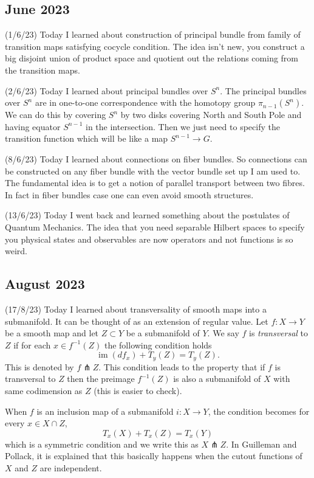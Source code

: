 \documentclass[12pt,a4paper]{article}
\begin{document}
\subsection*{June 2023}

\quad (1/6/23) Today I learned about construction of principal bundle from family of transition maps satisfying cocycle condition. The idea isn't new, you construct a big disjoint union of product space and quotient out the relations coming from the transition maps.

(2/6/23) Today I learned about principal bundles over $ S^{n} $. The principal bundles over $ S^{n} $ are in one-to-one correspondence with the homotopy group $ \pi_{n-1}(S^{n}) $. We can do this by covering $ S^{n} $ by two disks covering North and South Pole and having equator $ S^{n-1} $ in the intersection. Then we just need to specify the transition function which will be like a map $ S^{n-1} \to G $. 

(8/6/23) Today I learned about connections on fiber bundles. So connections can be constructed on any fiber bundle with the vector bundle set up I am used to. The fundamental idea is to get a notion of parallel transport between two fibres. In fact in fiber bundles case one can even avoid smooth structures.

(13/6/23) Today I went back and learned something about the postulates of Quantum Mechanics. The idea that you need separable Hilbert spaces to specify you physical states and observables are now operators and not functions is so weird.

\subsection*{August 2023}
\quad (17/8/23) Today I learned about transversality of smooth maps into a submanifold. It can be thought of as an extension of regular value. Let $ f :X \to Y $ be a smooth map and let $ Z \subset Y $ be a submanifold of $ Y $. We say $ f $ is \textit{transversal} to $ Z $ if for each $ x \in f^{-1}(Z) $ the following condition holds 
\[ \operatorname{im}(d f_{x})+ T_{y}(Z)  = T_{y}(Z).\]
This is denoted by $ f \pitchfork Z $. This condition leads to the property that if $ f $ is transversal to $ Z $ then the preimage $ f^{-1}(Z) $ is also a submanifold of $ X $ with same codimension as $ Z $ (this is easier to check).

When $ f $ is an inclusion map of a submanifold $ i : X \to Y $, the condition becomes for every $ x \in X \cap Z $, 
\[ T_{x}(X) + T_{x}(Z) = T_{x}(Y) \]
which is a symmetric condition and we write this as $ X \pitchfork Z $. In Guilleman and Pollack, it is explained that this basically happens when the cutout functions of $ X $ and $ Z $ are independent.
\end{document}
